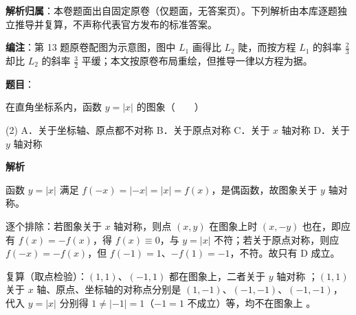 

\begin{gknotice}
\textbf{解析归属}：本卷题面出自固定原卷（仅题面，无答案页）。下列解析由本库逐题独立推导并复算，不声称代表官方发布的标准答案。

\textbf{编注}：第 13 题原卷配图为示意图，图中 $L_1$ 画得比 $L_2$ 陡，而按方程 $L_1$ 的斜率 $\frac23$ 却比 $L_2$ 的斜率 $\frac32$ 平缓；本文按原卷布局重绘，但推导一律以方程为据。
\end{gknotice}

\begin{answer}

\textbf{题目}：

在直角坐标系内，函数 $y=|x|$ 的图象\mbox{（　　）}

\begin{gkopts}(2)
\task A．关于坐标轴、原点都不对称
\task B．关于原点对称
\task C．关于 $x$ 轴对称
\task D．关于 $y$ 轴对称
\end{gkopts}

\textbf{解析}

函数 $y=|x|$ 满足 $f(-x)=|-x|=|x|=f(x)$，是偶函数，故图象关于 $y$ 轴对称。

逐个排除：若图象关于 $x$ 轴对称，则点 $(x,y)$ 在图象上时 $(x,-y)$ 也在，即应有 $f(x)=-f(x)$，得 $f(x)\equiv0$，与 $y=|x|$ 不符；若关于原点对称，则应 $f(-x)=-f(x)$，但 $f(-1)=1$、$-f(1)=-1$，不符。故只有 D 成立。

复算（取点检验）：$(1,1)$、$(-1,1)$ 都在图象上，二者关于 $y$ 轴对称 ；$(1,1)$ 关于 $x$ 轴、原点、坐标轴的对称点分别是 $(1,-1)$、$(-1,-1)$、$(-1,-1)$，代入 $y=|x|$ 分别得 $1\ne|-1|=1$（$-1=1$ 不成立）等，均不在图象上 。


\end{answer}
